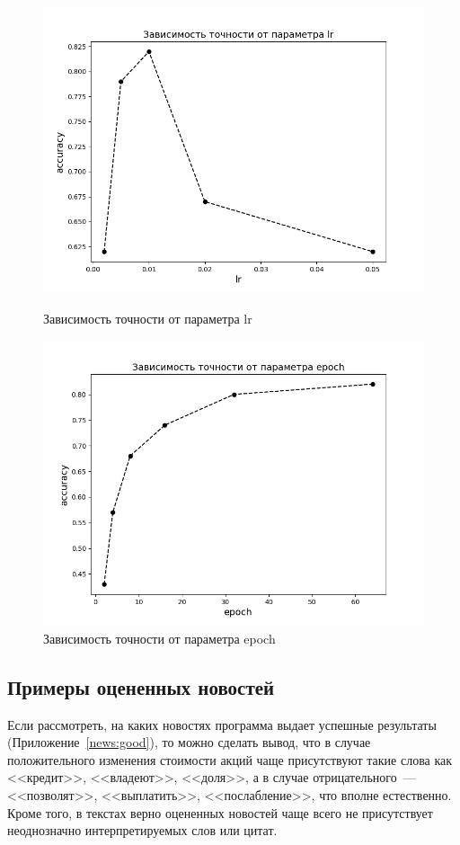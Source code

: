 \documentclass[14pt]{matmex-diploma-custom}
\begin{document}
\begin{figure}[!htb]
\includegraphics[width=\linewidth]{img/lr}
\caption{Зависимость точности от параметра lr}
\label{img:lr}
\endminipage
\hfill
{}
\includegraphics[width=\linewidth]{img/epoch}
\caption{Зависимость точности от параметра epoch}
\label{img:epoch}
\endminipage
\end{figure}

\subsection{Примеры оцененных новостей}

Если рассмотреть, на каких новостях программа выдает успешные результаты (Приложение~\ref{news:good}), то можно сделать вывод, что в случае положительного изменения стоимости акций чаще присутствуют такие слова как <<кредит>>, <<владеют>>, <<доля>>, а в случае отрицательного~--- <<позволят>>, <<выплатить>>, <<послабление>>, что вполне естественно. Кроме того, в текстах верно оцененных новостей чаще всего не присутствует неоднозначно интерпретируемых слов или цитат.
\end{document}
